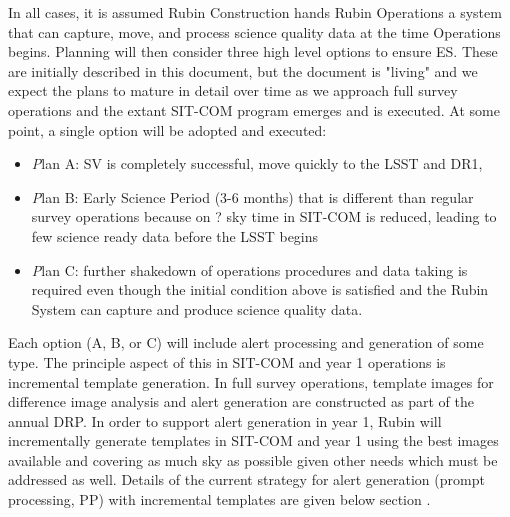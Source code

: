 In all cases, it is assumed Rubin Construction hands Rubin Operations a system that can capture, move, and process science quality data at the time Operations begins. Planning will then consider three high level options to ensure ES. These are initially described in this document, but the document is "living" and we expect the plans to mature in detail over time as we approach full survey operations and the extant SIT-COM program emerges and is executed. At some point, a single option will be adopted and executed:

\begin{itemize}
\item {\textit Plan A:} SV is completely successful, move quickly to the LSST and DR1,
\item {\textit Plan B:} Early Science Period (3-6 months) that is different than regular survey operations because on ? sky time in SIT-COM is reduced, leading to few science ready data before the LSST begins
\item {\textit Plan C:} further shakedown of operations procedures and data taking is required even though the initial condition above is satisfied and the Rubin System can capture and produce science quality data.

\end{itemize}

Each option (A, B, or C) will include alert processing and generation of some type. The principle aspect of this in SIT-COM and year 1 operations is incremental template generation. In full survey operations, template images for difference image analysis and alert generation are constructed as part of the annual DRP. In order to support alert generation in year 1, Rubin will incrementally generate templates in SIT-COM and year 1 using the best images available and covering as much sky as possible given other needs which must be addressed as well. Details of the current strategy for alert generation (prompt processing, PP) with incremental templates are given below section .  




